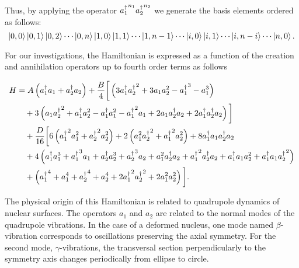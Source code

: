\documentclass[../thesis.tex]{subfiles}
\begin{document}
Thus, by applying the operator \({a_{1}^{\dagger}}^{n_1} {a_{2}^{\dagger}}^{n_2}\)
we generate
the basis elements ordered as follows:
\[
  \ket{0, 0} \ket{0, 1} \ket{0, 2} \cdots \ket{0, n} \ket{1, 0} \ket{1, 1}
  \cdots \ket{1, n - 1} \cdots \ket{i, 0} \ket{i, 1} \cdots \ket{i, n - i} \cdots
  \ket{n, 0}.
\]

For our investigations, the Hamiltonian is expressed as a function of the creation and annihilation
operators up to fourth order terms as follows

\begin{equation}
\label{eq:hamilt}
\begin{split}
  H &= A \left( a_{1}^{\dagger} a_1 + a_{2}^{\dagger} a_2 \right)
    + \frac{B}{4} \bigg[ \left( 3 a_{1}^{\dagger} {a_{2}^{\dagger}}^2 + 3 a_1 a_2^2
                               - {a_{1}^{\dagger}}^3 - a_1^3 \right)   \\
  &\quad + 3 \left( a_1 {a_{2}^{\dagger}}^2 + a_{1}^{\dagger} a_2^2 - a_{1}^{\dagger} a_1^2 - {a_{1}^{\dagger}}^2 a_1
             + 2 a_1 a_{2}^{\dagger} a_2 + 2 a_{1}^{\dagger} a_{2}^{\dagger} a_2
          \right) \bigg]  \\
  &\quad + \frac{D}{16} \bigg[ 6 \left( {a_{1}^{\dagger}}^2 a_1^2 + {a_{2}^{\dagger}}^2 a_2^2 \right)
                        + 2 \left( a_1^2 {a_{2}^{\dagger}}^2 + {a_{1}^{\dagger}}^2 a_2^2 \right)
                        + 8 a_{1}^{\dagger} a_1 a_{2}^{\dagger} a_2  \\
  &\quad + 4 \left(a_{1}^{\dagger} a_1^3 + {a_{1}^{\dagger}}^3 a_1 + a_{2}^{\dagger} a_2^3 + {a_{2}^{\dagger}}^3 a_2
     + a_1^2 a_{2}^{\dagger} a_2 + {a_{1}^{\dagger}}^2 a_{2}^{\dagger} a_2 + a_{1}^{\dagger} a_1 a_2^2 + a_{1}^{\dagger} a_1 {a_{2}^{\dagger}}^2
        \right)  \\
  &\quad + \left( {a_{1}^{\dagger}}^4 + a_1^4 + {a_{2}^{\dagger}}^4 + a_2^4
     + 2 {a_{1}^{\dagger}}^2 {a_{2}^{\dagger}}^2 + 2 a_1^2 a_2^2
      \right)
                        \bigg].
\end{split}
\end{equation}

The physical origin of this Hamiltonian is related to quadrupole dynamics of
nuclear surfaces\cite{Baran1998, Baran1996}.
The operators \(a_1\) and \(a_2\) are related to the normal modes of the
quadrupole vibrations. In the case of a deformed nucleus, one mode named \(\beta \)-vibration
corresponds to oscillations preserving the axial symmetry.
For the second mode, \(\gamma \)-vibrations,
the transversal section perpendicularly to the symmetry axis changes periodically
from ellipse to circle.
\end{document}
